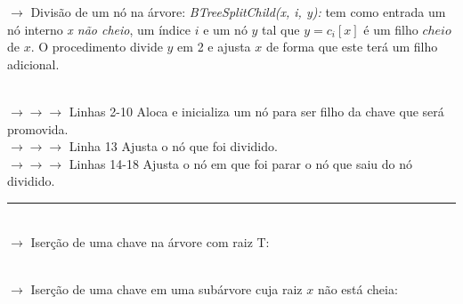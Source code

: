 \documentclass[a4paper, 12pt]{article}
\begin{document}
$\rightarrow$ Divisão de um nó na árvore: \textit{BTreeSplitChild(x, i, y):} tem como entrada um nó interno \textit{x não cheio}, um índice $i$ e um nó $y$ tal que $y = c_{i}[x]$ é um filho $cheio$ de $x$. O procedimento divide $y$ em 2 e ajusta $x$ de forma que este terá um filho adicional.\\

\begin{algorithmic}[1]
\EndFor
{}
	\EndFor
\EndIf
{}
\EndFor
{}
\end{algorithmic}
\textcolor{white}{               }\\
$\rightarrow \rightarrow \rightarrow$ Linhas 2-10 Aloca e inicializa um nó para ser filho da chave que será promovida.\\
$\rightarrow \rightarrow \rightarrow$ Linha 13 Ajusta o nó que foi dividido.\\
$\rightarrow \rightarrow \rightarrow$ Linhas 14-18 Ajusta o nó em que foi parar o nó que saiu do nó dividido.

\rule{12cm}{0.4pt}\\

$\rightarrow$ Iserção de uma chave na árvore com raiz T:\\

\begin{algorithmic}[1]
\Else
\EndIf
\end{algorithmic}
\textcolor{white}{               }\\

$\rightarrow$ Iserção de uma chave em uma subárvore cuja raiz $x$ não está cheia:\\

\begin{algorithmic}[1]
	\EndWhile
\Else
	\EndWhile
		\EndIf
	\EndIf
\EndIf
\end{algorithmic}
\end{document}
